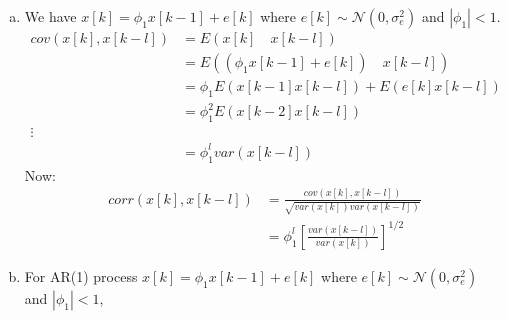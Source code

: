 \documentclass[11pt,paper=a4,answers]{exam}
\begin{document}
\begin{questions}

\pointformat{\boldmath\themarginpoints}
\question
\begin{enumerate}[(a)]
\item
We have $x[k] = \phi_1 x[k-1] + e[k]$ where $e[k] \sim \mathcal{N}(0, \sigma_e ^2)$ and $|\phi_1| < 1$.
\begin{align}
    cov(x[k], x[k-l]) &= E(x[k] \quad x[k-l]) \nonumber \\
    &= E((\phi_1 x[k-1] + e[k]) \quad x[k-l]) \nonumber \\
    &= \phi_1 E(x[k-1] x[k-l]) + E(e[k] x[k-l]) \nonumber\\
    &= \phi_1 ^2 E(x[k-2] x[k-l])  \nonumber\\
    \vdots \nonumber \\
    &= \phi_1 ^l var(x[k-l])
\end{align}
Now:
\begin{align}
    corr(x[k], x[k-l]) &= \frac{cov(x[k], x[k-l])}{\sqrt{var(x[k])var(x[k-l])}} \nonumber \\
    &= \phi_1 ^l \left[ \frac{var(x[k-l])}{var(x[k])}\right]^{1/2} \nonumber
\end{align}
\item 
For AR(1) process $x[k] = \phi_1 x[k-1] + e[k]$ where $e[k] \sim \mathcal{N}(0, \sigma_e ^2)$ and $|\phi_1| < 1$,


\end{enumerate}
\end{questions}
\end{document}
